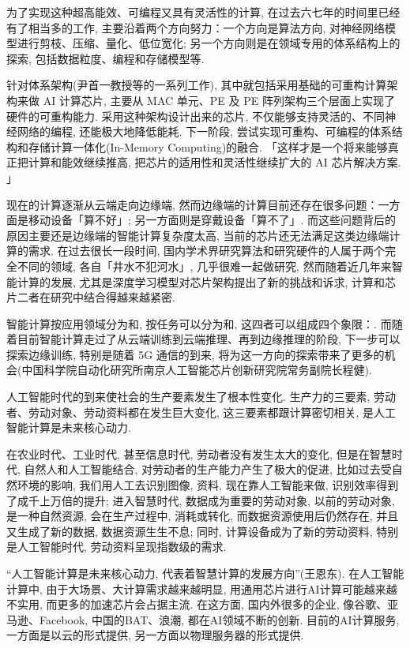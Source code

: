 为了实现这种超高能效、可编程又具有灵活性的计算, 在过去六七年的时间里已经有了相当多的工作, 主要沿着两个方向努力：一个方向是算法方向, 对神经网络模型进行剪枝、压缩、量化、低位宽化; 另一个方向则是在领域专用的体系结构上的探索, 包括数据粒度、编程和存储模型等.

针对体系架构(尹首一教授等的一系列工作), 其中就包括采用基础的可重构计算架构来做 AI 计算芯片, 主要从 MAC 单元、PE 及 PE 阵列架构三个层面上实现了硬件的可重构能力. 采用这种架构设计出来的芯片, 不仅能够支持灵活的、不同神经网络的编程, 还能极大地降低能耗.
下一阶段, 尝试实现可重构、可编程的体系结构和存储计算一体化(In-Memory Computing)的融合. 「这样才是一个将来能够真正把计算和能效继续推高, 把芯片的适用性和灵活性继续扩大的 AI 芯片解决方案. 」

现在的计算逐渐从云端走向边缘端, 然而边缘端的计算目前还存在很多问题：一方面是移动设备「算不好」; 另一方面则是穿戴设备「算不了」. 而这些问题背后的原因主要还是边缘端的智能计算复杂度太高, 当前的芯片还无法满足这类边缘端计算的需求.
在过去很长一段时间, 国内学术界研究算法和研究硬件的人属于两个完全不同的领域, 各自「井水不犯河水」, 几乎很难一起做研究, 然而随着近几年来智能计算的发展, 尤其是深度学习模型对芯片架构提出了新的挑战和诉求, 计算和芯片二者在研究中结合得越来越紧密.

智能计算按应用领域分为和, 按任务可以分为和, 这四者可以组成四个象限：. 而随着目前智能计算走过了从云端训练到云端推理、再到边缘推理的阶段, 下一步可以探索边缘训练, 特别是随着 5G 通信的到来, 将为这一方向的探索带来了更多的机会(中国科学院自动化研究所南京人工智能芯片创新研究院常务副院长程健).

人工智能时代的到来使社会的生产要素发生了根本性变化. 生产力的三要素, 劳动者、劳动对象、劳动资料都在发生巨大变化, 这三要素都跟计算密切相关, 是人工智能计算是未来核心动力.

在农业时代、工业时代, 甚至信息时代, 劳动者没有发生太大的变化, 但是在智慧时代, 自然人和人工智能结合, 对劳动者的生产能力产生了极大的促进, 比如过去受自然环境的影响, 我们用人工去识别图像, 资料, 现在靠人工智能来做, 识别效率得到了成千上万倍的提升; 进入智慧时代, 数据成为重要的劳动对象, 以前的劳动对象, 是一种自然资源, 会在生产过程中, 消耗或转化, 而数据资源使用后仍然存在, 并且又生成了新的数据, 数据资源生生不息; 同时, 计算设备成为了新的劳动资料, 特别是人工智能时代, 劳动资料呈现指数级的需求.

“人工智能计算是未来核心动力, 代表着智慧计算的发展方向”(王恩东). 在人工智能计算中, 由于大场景、大计算需求越来越明显, 用通用芯片进行AI计算可能越来越不实用, 而更多的加速芯片会占据主流. 在这方面, 国内外很多的企业, 像谷歌、亚马逊、Facebook, 中国的BAT、浪潮, 都在AI领域不断的创新. 目前的AI计算服务, 一方面是以云的形式提供, 另一方面以物理服务器的形式提供.

